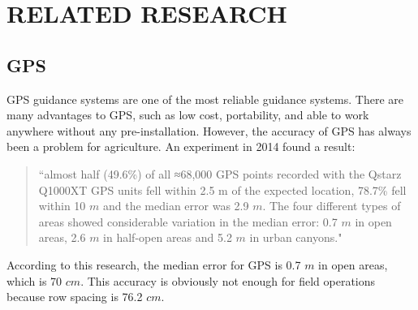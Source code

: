 \chapter{RELATED RESEARCH}

\section{GPS}
GPS guidance systems are one of the most reliable guidance systems. There are many advantages to GPS, such as low cost, portability, and able to work anywhere without any pre-installation. However, the accuracy of GPS has always been a problem for agriculture. An experiment \cite{schipperijn2014dynamic} in 2014 found a result: 
\begin{quote}
``almost half (49.6\%) of all ≈68,000 GPS points recorded with the Qstarz Q1000XT GPS units fell within 2.5 m of the expected location, 78.7\% fell within 10 $m$ and the median error was 2.9 $m$. The four different types of areas showed considerable variation in the median error: 0.7 $m$ in open areas, 2.6 $m$ in half-open areas and 5.2 $m$ in urban canyons."
\end{quote}
According to this research, the median error for GPS is 0.7 $m$ in open areas, which is 70 $cm$. This accuracy is obviously not enough for field operations because row spacing is 76.2 $cm$.

